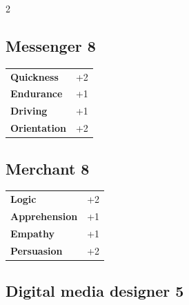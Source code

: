 \begin{multicols}{2}
\begin{tcolorbox}
\end{tcolorbox}

\begin{tcolorbox}
    \subsection*{Messenger \hfill \small{8 }}
    \tcblower




\begin{tabular}{@{}ll@{}}
    \textbf{Quickness} & +2\\
    \textbf{Endurance} & +1\\
    \textbf{Driving} & +1\\
    \textbf{Orientation} & +2\\
\end{tabular}


\end{tcolorbox}

\begin{tcolorbox}
    \subsection*{Merchant \hfill \small{8 }}
    \tcblower




\begin{tabular}{@{}ll@{}}
    \textbf{Logic} & +2\\
    \textbf{Apprehension} & +1\\
    \textbf{Empathy} & +1\\
    \textbf{Persuasion} & +2\\
\end{tabular}


\end{tcolorbox}

\begin{tcolorbox}
    \subsection*{Digital media designer \hfill \small{5 }}
    \tcblower





\end{tcolorbox}
\end{multicols}
